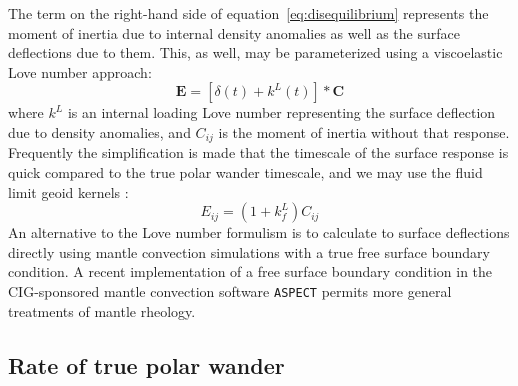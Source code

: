 \documentclass[extra,mreferee]{gji}
\begin{document}
The term on the right-hand side of equation~\eqref{eq:disequilibrium} represents the moment of inertia due to internal density anomalies as well as the surface deflections due to them.
This, as well, may be parameterized using a viscoelastic Love number approach:
\begin{equation} 
\mathbf{E} = \left[ \delta(t) + k^L(t) \right] * \mathbf{C}
\end{equation}
where $k^L$ is an internal loading Love number representing the surface deflection due to density anomalies, and $C_{ij}$ is the moment of inertia without that response.
Frequently the simplification is made that the timescale of the surface response is quick compared to the true polar wander timescale, and we may use the fluid limit geoid kernels \citep[e.g.][]{richards1984geoid}:  
\begin{equation}
E_{ij} = (1+k^L_f) C_{ij}
\end{equation}
An alternative to the Love number formulism is to calculate to surface deflections directly using mantle convection simulations with a true free surface boundary condition.
A recent implementation of a free surface boundary condition in the CIG-sponsored mantle convection software \texttt{ASPECT} \citep{rose2015free}
permits more general treatments of mantle rheology.

\subsection{Rate of true polar wander}
\label{sec:tpw_rate}
\end{document}
